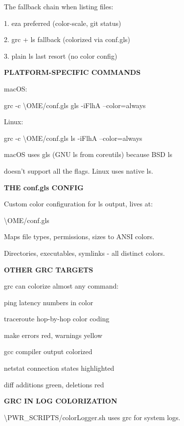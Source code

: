 \documentclass[11pt,a4paper,twoside]{book}
\begin{document}
The fallback chain when listing files:

1. eza              preferred (color-scale, git status)

2. grc + ls         fallback (colorized via conf.gls)

3. plain ls         last resort (no color config)


\vspace{12pt}
{\bfseries\color{neonyellow} PLATFORM-SPECIFIC COMMANDS}\vspace{4pt}

macOS:

grc -c \textbackslash{}OME/conf.gls gls -iFlhA --color=always

Linux:

grc -c \textbackslash{}OME/conf.gls ls -iFlhA --color=always

macOS uses gls (GNU ls from coreutils) because BSD ls

doesn't support all the flags. Linux uses native ls.


\vspace{12pt}
{\bfseries\color{neonyellow} THE conf.gls CONFIG}\vspace{4pt}

Custom color configuration for ls output, lives at:

\textbackslash{}OME/conf.gls

Maps file types, permissions, sizes to ANSI colors.

Directories, executables, symlinks - all distinct colors.


\vspace{12pt}
{\bfseries\color{neonyellow} OTHER GRC TARGETS}\vspace{4pt}

grc can colorize almost any command:

ping         latency numbers in color

traceroute   hop-by-hop color coding

make         errors red, warnings yellow

gcc          compiler output colorized

netstat      connection states highlighted

diff         additions green, deletions red


\vspace{12pt}
{\bfseries\color{neonyellow} GRC IN LOG COLORIZATION}\vspace{4pt}

\textbackslash{}PWR\_SCRIPTS/colorLogger.sh uses grc for system logs.
\end{document}

